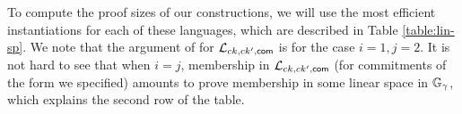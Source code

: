  To compute the proof sizes of our constructions, we will use the most efficient instantiations for each of these languages, which are described in Table \ref{table:lin-sp}. We note that the argument of \cite{AC:GonHevRaf15} for $\mathcal{L}_{ck,ck',\mathsf{com}}$ is for the case $i=1,j=2$. It is not hard to see that when $i=j$, membership in $\mathcal{L}_{ck,ck',\mathsf{com}}$ (for commitments of the form we specified) amounts to prove membership in some linear space in $\mathbb{G}_\gamma$, which explains the second row of the table.  






%

%
